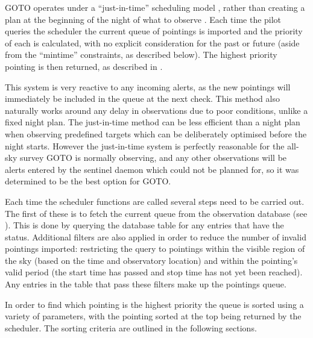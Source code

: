\begin{colsection}

GOTO operates under a ``just-in-time'' scheduling model \citep[see, for example,][]{LCO_scheduling}, rather than creating a plan at the beginning of the night of what to observe \citep[see, for example,][]{ZTF_scheduler}. Each time the pilot queries the scheduler the current queue of pointings is imported and the priority of each is calculated, with no explicit consideration for the past or future (aside from the ``mintime'' constraints, as described below). The highest priority pointing is then returned, as described in .

This system is very reactive to any incoming alerts, as the new pointings will immediately be included in the queue at the next check. This method also naturally works around any delay in observations due to poor conditions, unlike a fixed night plan. The just-in-time method can be less efficient than a night plan when observing predefined targets which can be deliberately optimised before the night starts. However the just-in-time system is perfectly reasonable for the all-sky survey GOTO is normally observing, and any other observations will be alerts entered by the sentinel daemon which could not be planned for, so it was determined to be the best option for GOTO.\@

Each time the scheduler functions are called several steps need to be carried out. The first of these is to fetch the current queue from the observation database (see ). This is done by querying the database  table for any entries that have the  status. Additional filters are also applied in order to reduce the number of invalid pointings imported: restricting the query to pointings within the visible region of the sky (based on the time and observatory location) and within the pointing's valid period (the start time has passed and stop time has not yet been reached). Any entries in the table that pass these filters make up the pointings queue.

In order to find which pointing is the highest priority the queue is sorted using a variety of parameters, with the pointing sorted at the top being returned by the scheduler. The sorting criteria are outlined in the following sections.

\end{colsection}


